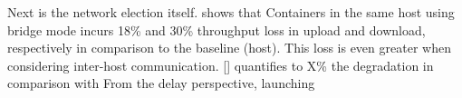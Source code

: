 \documentclass[conference]{IEEEtran}
\begin{document}
Next is the network election itself. \cite{IEEE_INFOCOM_2018:K. Suo} shows that Containers in the same host using bridge mode incurs 18\% and 30\% throughput loss in upload and download, respectively in comparison to the baseline (host). This loss is even greater when considering inter-host communication. [] quantifies to X\% the degradation in comparison with 
From the delay perspective, launching






%
%



%
%
\end{document}
